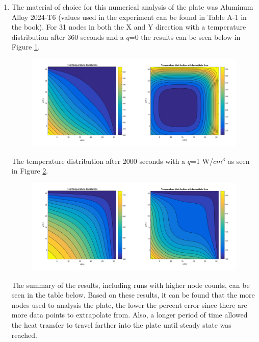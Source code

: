 \begin{enumerate}
    \item The material of choice for this numerical analysis of the plate was Aluminum Alloy 2024-T6 (values used in the experiment can be found in Table A-1 in the book). For 31 nodes in both the X and Y direction with a temperature distribution after 360 seconds and a ${\dot{q}}$=0 the results can be seen below in Figure \ref{fig_q4_1}.
    \begin{figure}[H]
        \centering
        \includegraphics[width=5in]{pictures/time_360_31_0.png}
        \caption{}
        \label{fig_q4_1}
    \end{figure}
    The temperature distribution after 2000 seconds with a ${\dot{q}}$=1 W/${ cm }^{ 3 }$ as seen in Figure \ref{fig_q4_3}.
    \begin{figure}[H]
        \centering
        \includegraphics[width=5in]{pictures/time_2000_31_1.png}
        \caption{}
        \label{fig_q4_3}
    \end{figure}
    The summary of the results, including runs with higher node counts, can be seen in the table below. Based on these results, it can be found that the more nodes used to analysis the plate, the lower the percent error since there are more data points to extrapolate from. Also, a longer period of time allowed the heat transfer to travel farther into the plate until steady state was reached.
    \begin{center}
    \begin{tabular}{r r r r r}

\end{tabular}
\end{center}
\end{enumerate}
